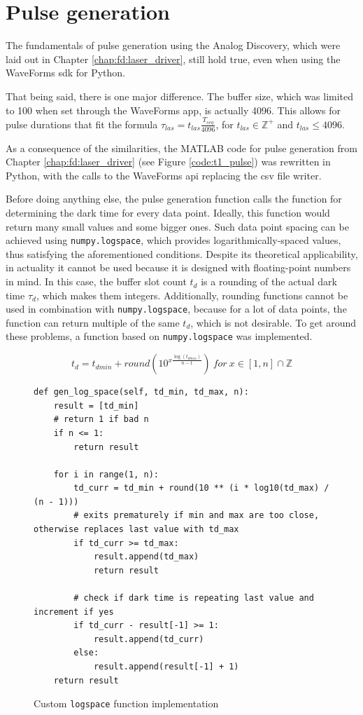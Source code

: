 \section{Pulse generation}
The fundamentals of pulse generation using the Analog Discovery, which were laid out in Chapter \ref{chap:fd:laser_driver}, still hold true, even when using the WaveForms \gls{sdk} for Python.

That being said, there is one major difference. The buffer size, which was limited to 100 when set through the WaveForms app, is actually 4096. This allows for pulse durations that fit the formula $\tau_{las} = t_{las}\frac{T_{seq}}{4096}$, for $t_{las} \in \mathbb{Z}^+$ and $t_{las} \leq 4096$.

As a consequence of the similarities, the MATLAB code for pulse generation from Chapter \ref{chap:fd:laser_driver} (see Figure \ref{code:t1_pulse}) was rewritten in Python, with the calls to the WaveForms \gls{api} replacing the \gls{csv} file writer. 

Before doing anything else, the pulse generation function calls the function for determining the dark time for every data point. Ideally, this function would return many small values and some bigger ones. Such data point spacing can be achieved using \lstinline|numpy.logspace|, which provides logarithmically-spaced values, thus satisfying the aforementioned conditions. Despite its theoretical applicability, in actuality it cannot be used because it is designed with floating-point numbers in mind. In this case, the buffer slot count $t_d$ is a rounding of the actual dark time $\tau_d$, which makes them integers. Additionally, rounding functions cannot be used in combination with \lstinline|numpy.logspace|, because for a lot of data points, the function can return multiple of the same $t_d$, which is not desirable. To get around these problems, a function based on \lstinline|numpy.logspace| was implemented. 

\begin{equation}\label{eq:logpspace_custom}
	t_{d} = t_{dmin} + round(10^{x\frac{\log(t_{dmax})}{n - 1}})\ for\ x \in [1,n]\cap \mathbb{Z}
\end{equation}

\begin{figure}[ht]
	\begin{lstlisting}[language=pythe]
def gen_log_space(self, td_min, td_max, n):
	result = [td_min]
	# return 1 if bad n
	if n <= 1:
		return result
		
	for i in range(1, n):
		td_curr = td_min + round(10 ** (i * log10(td_max) / (n - 1)))
		# exits prematurely if min and max are too close, otherwise replaces last value with td_max
		if td_curr >= td_max:
			result.append(td_max)
			return result
		
		# check if dark time is repeating last value and increment if yes
		if td_curr - result[-1] >= 1:
			result.append(td_curr)
		else:
			result.append(result[-1] + 1)
	return result
	\end{lstlisting}
	\caption{Custom \lstinline|logspace| function implementation}
	\label{fig:td:logspace_gen_func}
\end{figure}



